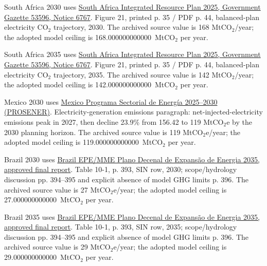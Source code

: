 \documentclass[pdflatex,sn-nature]{sn-jnl}
\begin{document}
\begin{appendices}
South Africa 2030 uses \href{https://www.gov.za/sites/default/files/gcis\_document/202510/53596gon6767.pdf}{South Africa Integrated Resource Plan 2025, Government Gazette 53596, Notice 6767}. Figure 21, printed p. 35 / PDF p. 44, balanced-plan electricity CO$_2$ trajectory, 2030. The archived source value is 168 MtCO$_2$/year; the adopted model ceiling is 168.000000000000~MtCO$_2$ per year.\par

South Africa 2035 uses \href{https://www.gov.za/sites/default/files/gcis\_document/202510/53596gon6767.pdf}{South Africa Integrated Resource Plan 2025, Government Gazette 53596, Notice 6767}. Figure 21, printed p. 35 / PDF p. 44, balanced-plan electricity CO$_2$ trajectory, 2035. The archived source value is 142 MtCO$_2$/year; the adopted model ceiling is 142.000000000000~MtCO$_2$ per year.\par

Mexico 2030 uses \href{https://sidof.segob.gob.mx/notas/docFuente/5776838}{Mexico Programa Sectorial de Energía 2025--2030 (PROSENER)}. Electricity-generation emissions paragraph: net-injected-electricity emissions peak in 2027, then decline 23.9\% from 156.42 to 119 MtCO$_2$e by the 2030 planning horizon. The archived source value is 119 MtCO$_2$e/year; the adopted model ceiling is 119.000000000000~MtCO$_2$ per year.\par

Brazil 2030 uses \href{https://www.epe.gov.br/sites-pt/publicacoes-dados-abertos/publicacoes/Documents/PDE\%202035\_Relat\%C3\%B3rio\%20Final\_Aprovado.pdf}{Brazil EPE/MME Plano Decenal de Expansão de Energia 2035, approved final report}. Table 10-1, p. 393, SIN row, 2030; scope/hydrology discussion pp. 394--395 and explicit absence of model GHG limits p. 396. The archived source value is 27 MtCO$_2$e/year; the adopted model ceiling is 27.000000000000~MtCO$_2$ per year.\par

Brazil 2035 uses \href{https://www.epe.gov.br/sites-pt/publicacoes-dados-abertos/publicacoes/Documents/PDE\%202035\_Relat\%C3\%B3rio\%20Final\_Aprovado.pdf}{Brazil EPE/MME Plano Decenal de Expansão de Energia 2035, approved final report}. Table 10-1, p. 393, SIN row, 2035; scope/hydrology discussion pp. 394--395 and explicit absence of model GHG limits p. 396. The archived source value is 29 MtCO$_2$e/year; the adopted model ceiling is 29.000000000000~MtCO$_2$ per year.\par

\end{appendices}
\clearpage

\setlength{\bibsep}{0.8em}

\end{document}
